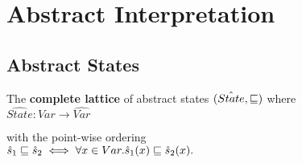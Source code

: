 \chapter{Abstract Interpretation}
\label{chap:ai}

\section{Abstract States}
\label{sec:abstract-states}

The \textbf{complete lattice} of abstract states
$ ( \hat{State}, \sqsubseteq ) $ where
\\
\begin{math}
  \hat{State} : Var \to \hat{Var}
\end{math}

with the point-wise ordering
\\
\begin{math}
  \hat{s}_1 \sqsubseteq \hat{s}_2 \iff \forall x \in Var. \hat{s}_1(x) \sqsubseteq
  \hat{s}_2(x).
\end{math}

